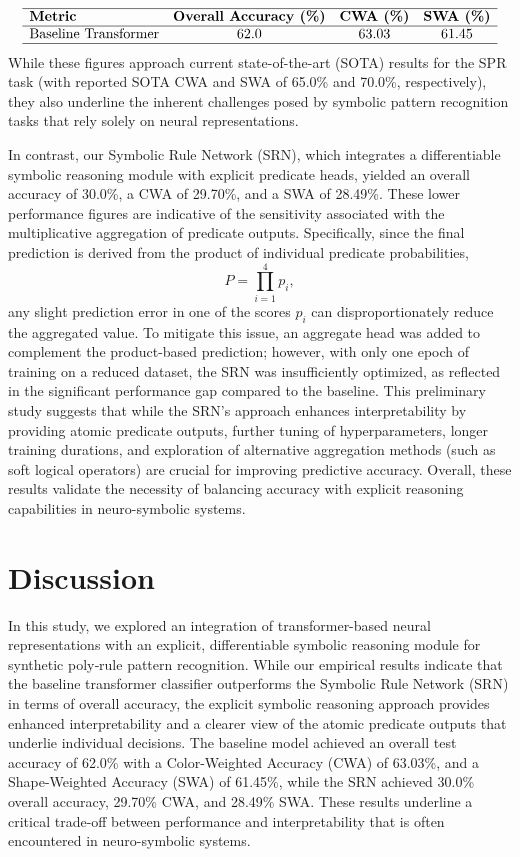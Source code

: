 \documentclass[11pt]{article}
\begin{document}
\[
\begin{array}{lccc}
\hline
\textbf{Metric} & \textbf{Overall Accuracy (\%)} & \textbf{CWA (\%)} & \textbf{SWA (\%)} \\
\hline
\text{Baseline Transformer} & 62.0 & 63.03 & 61.45 \\
\hline
\end{array}
\]
%
While these figures approach current state-of-the-art (SOTA) results for the SPR task (with reported SOTA CWA and SWA of 65.0\% and 70.0\%, respectively), they also underline the inherent challenges posed by symbolic pattern recognition tasks that rely solely on neural representations.

In contrast, our Symbolic Rule Network (SRN), which integrates a differentiable symbolic reasoning module with explicit predicate heads, yielded an overall accuracy of 30.0\%, a CWA of 29.70\%, and a SWA of 28.49\%. These lower performance figures are indicative of the sensitivity associated with the multiplicative aggregation of predicate outputs. Specifically, since the final prediction is derived from the product of individual predicate probabilities,
\[
P = \prod_{i=1}^{4} p_i,
\]
any slight prediction error in one of the scores \(p_i\) can disproportionately reduce the aggregated value. To mitigate this issue, an aggregate head was added to complement the product-based prediction; however, with only one epoch of training on a reduced dataset, the SRN was insufficiently optimized, as reflected in the significant performance gap compared to the baseline. This preliminary study suggests that while the SRN’s approach enhances interpretability by providing atomic predicate outputs, further tuning of hyperparameters, longer training durations, and exploration of alternative aggregation methods (such as soft logical operators) are crucial for improving predictive accuracy. Overall, these results validate the necessity of balancing accuracy with explicit reasoning capabilities in neuro-symbolic systems.

\section{Discussion}
In this study, we explored an integration of transformer-based neural representations with an explicit, differentiable symbolic reasoning module for synthetic poly‐rule pattern recognition. While our empirical results indicate that the baseline transformer classifier outperforms the Symbolic Rule Network (SRN) in terms of overall accuracy, the explicit symbolic reasoning approach provides enhanced interpretability and a clearer view of the atomic predicate outputs that underlie individual decisions. The baseline model achieved an overall test accuracy of 62.0\% with a Color-Weighted Accuracy (CWA) of 63.03\%, and a Shape-Weighted Accuracy (SWA) of 61.45\%, while the SRN achieved 30.0\% overall accuracy, 29.70\% CWA, and 28.49\% SWA. These results underline a critical trade-off between performance and interpretability that is often encountered in neuro-symbolic systems.
\end{document}
